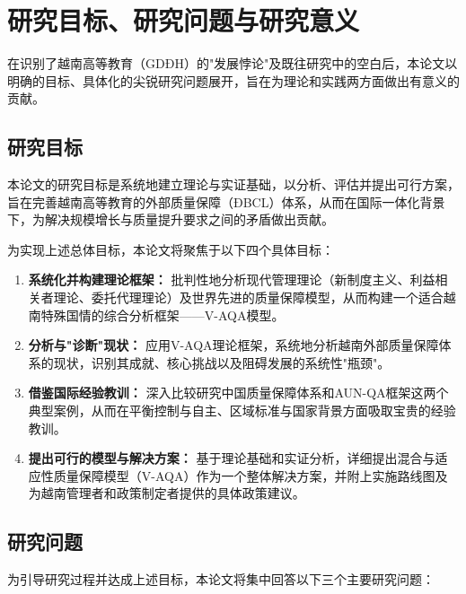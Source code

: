
\section{研究目标、研究问题与研究意义}
\label{sec:muc_tieu_y_nghia}

在识别了越南高等教育（GDĐH）的"发展悖论"及既往研究中的空白后，本论文以明确的目标、具体化的尖锐研究问题展开，旨在为理论和实践两方面做出有意义的贡献。

\subsection{研究目标}
\label{subsec:muc_tieu_nghien_cuu}

本论文的研究目标是系统地建立理论与实证基础，以分析、评估并提出可行方案，旨在完善越南高等教育的外部质量保障（ĐBCL）体系，从而在国际一体化背景下，为解决规模增长与质量提升要求之间的矛盾做出贡献。

为实现上述总体目标，本论文将聚焦于以下四个具体目标：
\begin{enumerate}
    \item \textbf{系统化并构建理论框架：} 批判性地分析现代管理理论（新制度主义、利益相关者理论、委托代理理论）及世界先进的质量保障模型，从而构建一个适合越南特殊国情的综合分析框架——V-AQA模型。
    
    \item \textbf{分析与"诊断"现状：} 应用V-AQA理论框架，系统地分析越南外部质量保障体系的现状，识别其成就、核心挑战以及阻碍发展的系统性"瓶颈"。
    
    \item \textbf{借鉴国际经验教训：} 深入比较研究中国质量保障体系和AUN-QA框架这两个典型案例，从而在平衡控制与自主、区域标准与国家背景方面吸取宝贵的经验教训。
    
    \item \textbf{提出可行的模型与解决方案：} 基于理论基础和实证分析，详细提出混合与适应性质量保障模型（V-AQA）作为一个整体解决方案，并附上实施路线图及为越南管理者和政策制定者提供的具体政策建议。
\end{enumerate}

\subsection{研究问题}
\label{subsec:cau_hoi_nghien_cuu}

为引导研究过程并达成上述目标，本论文将集中回答以下三个主要研究问题：

